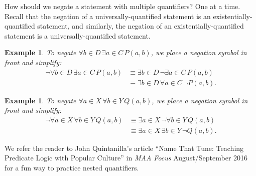 \documentclass{book}
\newcounter{ekcounter}%
\theoremstyle{ekimcustom}
\newtheorem{example}[ekcounter]{Example}
\begin{document}
How should we negate a statement with multiple quantifiers? One at a time. Recall that the negation of a universally-quantified statement is an existentially-quantified statement, and similarly, the negation of an existentially-quantified statement is a universally-quantified statement.
\begin{example}
To negate $\forall b \in D\,\exists a \in C\,P(a,b)$, we place a negation symbol in front and simplify:
\begin{align*}
\neg \forall b \in D\,\exists a \in C\,P(a,b)
&\equiv \exists b \in D\,\neg\exists a \in C\,P(a,b)\\
&\equiv \exists b \in D\,\forall a \in C\, \neg P(a,b).
\end{align*}
\end{example}
\begin{example}
To negate $\forall a \in X\,\forall b \in Y\,Q(a,b)$, we place a negation symbol in front and simplify:
\begin{align*}
\neg \forall a \in X\,\forall b \in Y\,Q(a,b)
&\equiv \exists a \in X\,\neg\forall b \in Y\,Q(a,b)\\
&\equiv \exists a \in X\,\exists b \in Y\,\neg Q(a,b).
\end{align*}
\end{example}

We refer the reader to John Quintanilla's article ``Name That Tune: Teaching Predicate Logic with Popular Culture'' in \emph{MAA Focus} August/September 2016 for a fun way to practice nested quantifiers.
\end{document}
